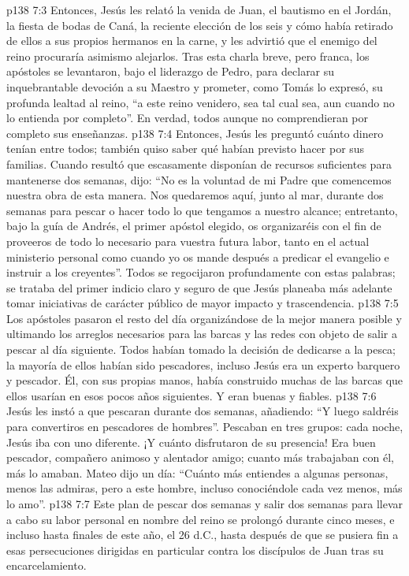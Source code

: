 \vs p138 7:3 Entonces, Jesús les relató la venida de Juan, el bautismo en el Jordán, la fiesta de bodas de Caná, la reciente elección de los seis y cómo había retirado de ellos a sus propios hermanos en la carne, y les advirtió que el enemigo del reino procuraría asimismo alejarlos. Tras esta charla breve, pero franca, los apóstoles se levantaron, bajo el liderazgo de Pedro, para declarar su inquebrantable devoción a su Maestro y prometer, como Tomás lo expresó, su profunda lealtad al reino, “a este reino venidero, sea tal cual sea, aun cuando no lo entienda por completo”. En verdad, todos  aunque no comprendieran por completo sus enseñanzas.
\vs p138 7:4 Entonces, Jesús les preguntó cuánto dinero tenían entre todos; también quiso saber qué habían previsto hacer por sus familias. Cuando resultó que escasamente disponían de recursos suficientes para mantenerse dos semanas, dijo: “No es la voluntad de mi Padre que comencemos nuestra obra de esta manera. Nos quedaremos aquí, junto al mar, durante dos semanas para pescar o hacer todo lo que tengamos a nuestro alcance; entretanto, bajo la guía de Andrés, el primer apóstol elegido, os organizaréis con el fin de proveeros de todo lo necesario para vuestra futura labor, tanto en el actual ministerio personal como cuando yo os mande después a predicar el evangelio e instruir a los creyentes”. Todos se regocijaron profundamente con estas palabras; se trataba del primer indicio claro y seguro de que Jesús planeaba más adelante tomar iniciativas de carácter público de mayor impacto y trascendencia.
\vs p138 7:5 Los apóstoles pasaron el resto del día organizándose de la mejor manera posible y ultimando los arreglos necesarios para las barcas y las redes con objeto de salir a pescar al día siguiente. Todos habían tomado la decisión de dedicarse a la pesca; la mayoría de ellos habían sido pescadores, incluso Jesús era un experto barquero y pescador. Él, con sus propias manos, había construido muchas de las barcas que ellos usarían en esos pocos años siguientes. Y eran buenas y fiables.
\vs p138 7:6 Jesús les instó a que pescaran durante dos semanas, añadiendo: “Y luego saldréis para convertiros en pescadores de hombres”. Pescaban en tres grupos: cada noche, Jesús iba con uno diferente. ¡Y cuánto disfrutaron de su presencia! Era buen pescador, compañero animoso y alentador amigo; cuanto más trabajaban con él, más lo amaban. Mateo dijo un día: “Cuánto más entiendes a algunas personas, menos las admiras, pero a este hombre, incluso conociéndole cada vez menos, más lo amo”.
\vs p138 7:7 Este plan de pescar dos semanas y salir dos semanas para llevar a cabo su labor personal en nombre del reino se prolongó durante cinco meses, e incluso hasta finales de este año, el 26 d.C., hasta después de que se pusiera fin a esas persecuciones dirigidas en particular contra los discípulos de Juan tras su encarcelamiento.
